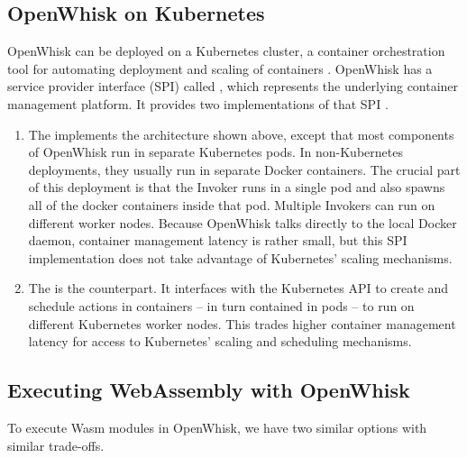 \subsection{OpenWhisk on Kubernetes}

OpenWhisk can be deployed on a Kubernetes cluster, a container orchestration tool for automating deployment and scaling of containers \cite{Kub2021}. OpenWhisk has a service provider interface (SPI) called , which represents the underlying container management platform. It provides two implementations of that SPI \cite{OWKub2020}.

\begin{enumerate}
    \item The  implements the architecture shown above, except that most components of OpenWhisk run in separate Kubernetes pods. In non-Kubernetes deployments, they usually run in separate Docker containers. The crucial part of this deployment is that the Invoker runs in a single pod and also spawns all of the docker containers inside that pod. Multiple Invokers can run on different worker nodes. Because OpenWhisk talks directly to the local Docker daemon, container management latency is rather small, but this SPI implementation does not take advantage of Kubernetes' scaling mechanisms.
    \item The  is the counterpart. It interfaces with the Kubernetes API to create and schedule actions in containers -- in turn contained in pods -- to run on different Kubernetes worker nodes. This trades higher container management latency for access to Kubernetes' scaling and scheduling mechanisms.
\end{enumerate}

\subsection{Executing WebAssembly with OpenWhisk}

To execute Wasm modules in OpenWhisk, we have two similar options with similar trade-offs.

